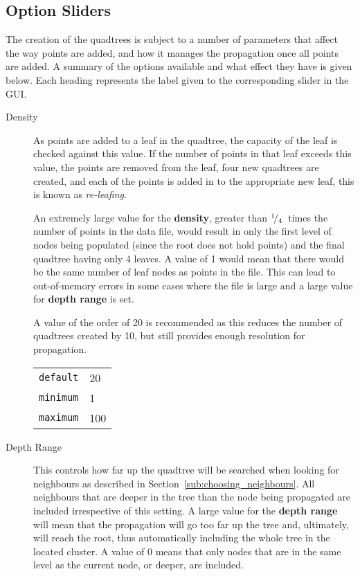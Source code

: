 
\subsection{Option Sliders}
\label{sub:option_sliders}

The creation of the quadtrees is subject to a number of parameters that affect
the way points are added, and how it manages the propagation once all points
are added. A summary of the options available and what effect they have is
given below. Each heading represents the label given to the corresponding
slider in the GUI\@.

\begin{description}

	\item[Density] As points are added to a leaf in the quadtree, the capacity
		of the leaf is checked against this value. If the number of points in
		that leaf exceeds this value, the points are removed from the leaf,
		four new quadtrees are created, and each of the points is added in to
		the appropriate new leaf, this is known as \emph{re-leafing}.

		An extremely large value for the \textbf{density}, greater than
		${}^{1}\!/_{4}$~times the number of points in the data file, would
		result in only the first level of nodes being populated (since the root
		does not hold points) and the final quadtree having only 4 leaves. A
		value of 1 would mean that there would be the same number of leaf nodes
		as points in the file. This can lead to out-of-memory errors in some
		cases where the file is large and a large value for \textbf{depth
		range} is set.

		A value of the order of 20 is recommended as this reduces the number of
		quadtrees created by 10, but still provides enough resolution for
		propagation.

		\begin{tabular}{r l}
			\texttt{default} & 20 \\
			\texttt{minimum} & 1 \\
			\texttt{maximum} & 100 \\
		\end{tabular}

	\item[Depth Range] This controls how far up the quadtree will be searched
		when looking for neighbours as described in
		Section~\ref{sub:choosing_neighbours}. All neighbours that are deeper
		in the tree than the node being propagated are included irrespective of
		this setting. A large value for the \textbf{depth range} will mean that
		the propagation will go too far up the tree and, ultimately, will reach
		the root, thus automatically including the whole tree in the located
		cluster. A value of 0 means that only nodes that are in the same level
		as the current node, or deeper, are included.


\end{description}
